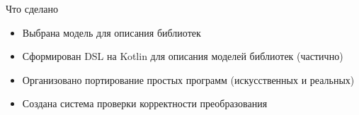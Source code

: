 \documentclass[12pt]{beamer}
\begin{document}
{
\begin{frame}{Что сделано}
  \begin{mybox}[]
  \begin{itemize}
  	\item Выбрана модель для описания библиотек
  	\item Сформирован DSL на Kotlin для описания моделей библиотек (частично)
  	\item Организовано портирование простых программ (искусственных и реальных)
  	\item Создана система проверки корректности преобразования
  \end{itemize}
  \end{mybox}
\end{frame}
}
\end{document}
